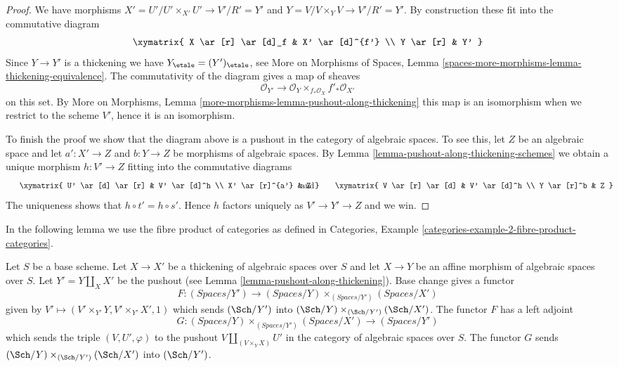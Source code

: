 \begin{proof}
\medskip\noindent
We have morphisms $X' = U'/U' \times_{X'} U' \to V'/R' = Y'$ and
$Y = V/V \times_Y V \to V'/R' = Y'$.
By construction these fit into the commutative diagram
$$
\xymatrix{
X \ar[r] \ar[d]_f & X' \ar[d]^{f'} \\
Y \ar[r] & Y'
}
$$
Since $Y \to Y'$ is a thickening we have
$Y_\etale = (Y')_\etale$, see More on Morphisms of Spaces,
Lemma \ref{spaces-more-morphisms-lemma-thickening-equivalence}.
The commutativity of the diagram gives a map of sheaves
$$
\mathcal{O}_{Y'}
\longrightarrow
\mathcal{O}_Y \times_{f_*\mathcal{O}_X} f'_*\mathcal{O}_{X'}
$$
on this set. By More on Morphisms, Lemma
\ref{more-morphisms-lemma-pushout-along-thickening}
this map is an isomorphism when we restrict to
the scheme $V'$, hence it is an isomorphism.

\medskip\noindent
To finish the proof we show that the diagram above is a pushout in
the category of algebraic spaces. To see this, let $Z$ be an algebraic
space and let $a' : X' \to Z$ and $b : Y \to Z$ be morphisms of
algebraic spaces. By
Lemma \ref{lemma-pushout-along-thickening-schemes}
we obtain a unique morphism $h : V' \to Z$ fitting into the commutative
diagrams
$$
\vcenter{
\xymatrix{
U' \ar[d] \ar[r] & V' \ar[d]^h \\
X' \ar[r]^{a'} & Z
}
}
\quad\text{and}\quad
\vcenter{
\xymatrix{
V \ar[r] \ar[d] & V' \ar[d]^h \\
Y \ar[r]^b & Z
}
}
$$
The uniqueness shows that $h \circ t' = h \circ s'$. Hence $h$ factors
uniquely as $V' \to Y' \to Z$ and we win.
\end{proof}

\noindent
In the following lemma we use the fibre product of categories as
defined in
Categories, Example \ref{categories-example-2-fibre-product-categories}.

\begin{lemma}
\label{lemma-categories-spaces-over-pushout}
Let $S$ be a base scheme. Let $X \to X'$ be a thickening of algebraic spaces
over $S$ and let $X \to Y$ be an affine morphism of algebraic spaces over $S$.
Let $Y' = Y \amalg_X X'$ be the pushout (see
Lemma \ref{lemma-pushout-along-thickening}). Base change gives a functor
$$
F :
(\textit{Spaces}/Y')
\longrightarrow
(\textit{Spaces}/Y) \times_{(\textit{Spaces}/Y')} (\textit{Spaces}/X')
$$
given by $V' \longmapsto (V' \times_{Y'} Y, V' \times_{Y'} X', 1)$ which
sends $(\Sch/Y')$ into $(\Sch/Y) \times_{(\Sch/Y')} (\Sch/X')$.
The functor $F$ has a left adjoint
$$
G :
(\textit{Spaces}/Y) \times_{(\textit{Spaces}/Y')} (\textit{Spaces}/X')
\longrightarrow
(\textit{Spaces}/Y')
$$
which sends the triple $(V, U', \varphi)$ to the pushout
$V \amalg_{(V \times_Y X)} U'$ in the category of algebraic spaces over $S$.
The functor $G$ sends $(\Sch/Y) \times_{(\Sch/Y')} (\Sch/X')$ into $(\Sch/Y')$.
\end{lemma}

